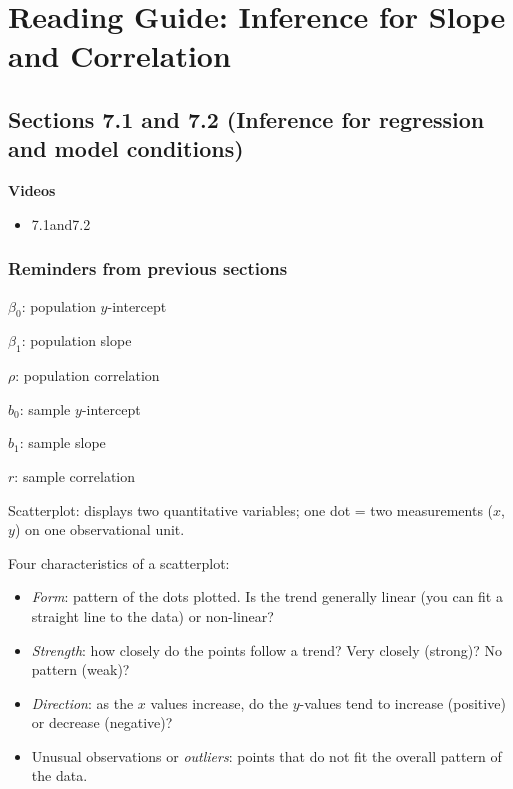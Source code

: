 \documentclass[
]{report}
\providecommand{\tightlist}{%
  \setlength{\itemsep}{0pt}\setlength{\parskip}{0pt}}
\begin{document}
\hypertarget{reading-guide-inference-for-slope-and-correlation}{%
\section{Reading Guide: Inference for Slope and Correlation}\label{reading-guide-inference-for-slope-and-correlation}}

\hypertarget{sections-7.1-and-7.2-inference-for-regression-and-model-conditions}{%
\subsection*{Sections 7.1 and 7.2 (Inference for regression and model conditions)}\label{sections-7.1-and-7.2-inference-for-regression-and-model-conditions}}

\textbf{Videos}

\begin{itemize}
\tightlist
\item
  7.1and7.2
\end{itemize}


\hypertarget{reminders-from-previous-sections-7}{%
\subsubsection*{Reminders from previous sections}\label{reminders-from-previous-sections-7}}

\(\beta_0\): population \(y\)-intercept

\(\beta_1\): population slope

\(\rho\): population correlation

\(b_0\): sample \(y\)-intercept

\(b_1\): sample slope

\(r\): sample correlation

Scatterplot: displays two quantitative variables; one dot = two measurements (\(x\), \(y\)) on one observational unit.

Four characteristics of a scatterplot:

\begin{itemize}
\tightlist
\item
  \emph{Form}: pattern of the dots plotted. Is the trend generally linear (you can fit a straight line to the data) or non-linear?\\
\item
  \emph{Strength}: how closely do the points follow a trend? Very closely (strong)? No pattern (weak)?\\
\item
  \emph{Direction}: as the \(x\) values increase, do the \(y\)-values tend to increase (positive) or decrease (negative)?\\
\item
  Unusual observations or \emph{outliers}: points that do not fit the overall pattern of the data.
\end{itemize}
\end{document}

